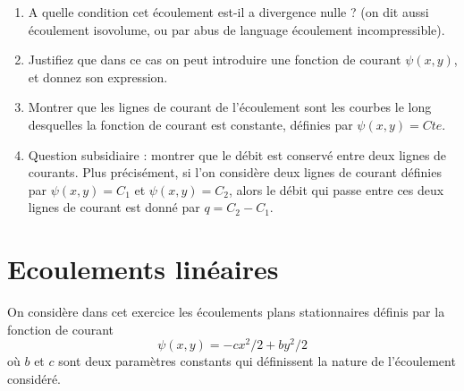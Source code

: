 \documentclass[10pt, a4paper]{article}
\begin{document}
\begin{enumerate}
\item
	A quelle condition cet écoulement est-il a divergence nulle ? (on dit aussi écoulement isovolume, ou par abus de language écoulement incompressible).
\item
	Justifiez que dans ce cas on peut introduire une fonction de courant $\psi(x,y)$, et donnez son expression.
	
	\item
	Montrer que les lignes de courant de l'écoulement sont les courbes le long desquelles 
	la fonction de courant est constante, définies par $\psi(x, y) = Cte$.
\item
	Question subsidiaire : montrer que le débit est conservé entre deux lignes de courants.
	Plus préci\-sé\-ment, si l'on considère deux lignes de courant  définies 
	par $\psi(x, y) = C_1$ et $\psi(x, y) = C_2$,
	alors le débit qui passe entre ces deux lignes de courant est donné par $q=C_2-C_1$.
\end{enumerate}

\section{Ecoulements linéaires}

On considère dans cet exercice les écoulements plans stationnaires définis par la fonction de courant 
\begin{equation}
	\psi(x, y) = -c x^{2}/2 + b y^{2}/2
	\label{eq:linearflow}
\end{equation}
où $b$ et $c$ sont deux paramètres constants qui définissent la nature de l'écoulement considéré.
\end{document}
